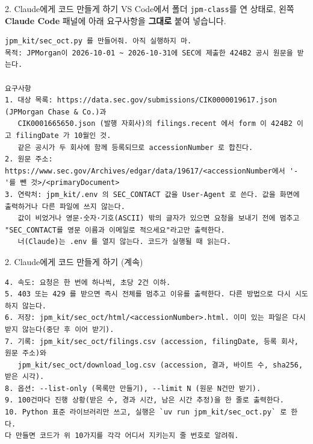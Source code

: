 \begin{frame}[fragile]{2. Claude에게 코드 만들게 하기}
\small
\noindent VS Code에서 폴더 \texttt{jpm-class}를 연 상태로, 왼쪽 \textbf{Claude Code} 패널에 아래 요구사항을 \textbf{그대로} 붙여 넣습니다.
\vspace{0.3em}
\begin{Verbatim}
jpm_kit/sec_oct.py 를 만들어줘. 아직 실행하지 마.
목적: JPMorgan이 2026-10-01 ~ 2026-10-31에 SEC에 제출한 424B2 공시 원문을 받는다.

요구사항
1. 대상 목록: https://data.sec.gov/submissions/CIK0000019617.json (JPMorgan Chase & Co.)과
   CIK0001665650.json (발행 자회사)의 filings.recent 에서 form 이 424B2 이고 filingDate 가 10월인 것.
   같은 공시가 두 회사에 함께 등록되므로 accessionNumber 로 합친다.
2. 원문 주소: https://www.sec.gov/Archives/edgar/data/19617/<accessionNumber에서 '-'를 뺀 것>/<primaryDocument>
3. 연락처: jpm_kit/.env 의 SEC_CONTACT 값을 User-Agent 로 쓴다. 값을 화면에 출력하거나 다른 파일에 쓰지 않는다.
   값이 비었거나 영문·숫자·기호(ASCII) 밖의 글자가 있으면 요청을 보내기 전에 멈추고 "SEC_CONTACT를 영문 이름과 이메일로 적으세요"라고만 출력한다.
   너(Claude)는 .env 를 열지 않는다. 코드가 실행될 때 읽는다.
\end{Verbatim}
\end{frame}

\begin{frame}[fragile]{2. Claude에게 코드 만들게 하기 (계속)}
\begin{Verbatim}
4. 속도: 요청은 한 번에 하나씩, 초당 2건 이하.
5. 403 또는 429 를 받으면 즉시 전체를 멈추고 이유를 출력한다. 다른 방법으로 다시 시도하지 않는다.
6. 저장: jpm_kit/sec_oct/html/<accessionNumber>.html. 이미 있는 파일은 다시 받지 않는다(중단 후 이어 받기).
7. 기록: jpm_kit/sec_oct/filings.csv (accession, filingDate, 등록 회사, 원문 주소)와
   jpm_kit/sec_oct/download_log.csv (accession, 결과, 바이트 수, sha256, 받은 시각).
8. 옵션: --list-only (목록만 만들기), --limit N (원문 N건만 받기).
9. 100건마다 진행 상황(받은 수, 경과 시간, 남은 시간 추정)을 한 줄로 출력한다.
10. Python 표준 라이브러리만 쓰고, 실행은 `uv run jpm_kit/sec_oct.py` 로 한다.
다 만들면 코드가 위 10가지를 각각 어디서 지키는지 줄 번호로 알려줘.
\end{Verbatim}
\end{frame}

